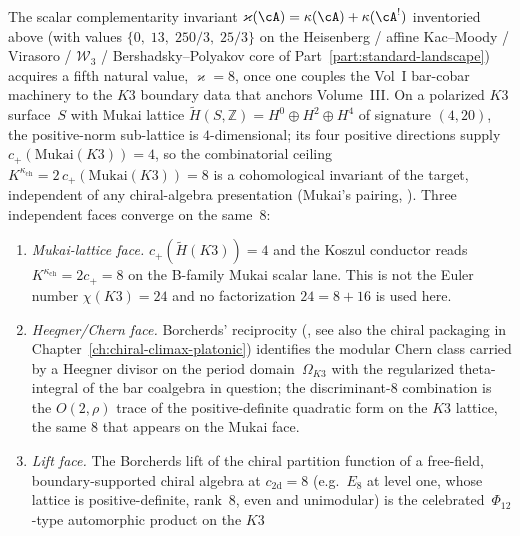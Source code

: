\begin{remark}
\label{rem:frontier-K3-bucket-enlargement}
\ClaimStatusConjectured
{}
The scalar complementarity invariant
$\varkappa(\cA) = \kappa(\cA) + \kappa(\cA^!)$
inventoried above (with values $\{0,\;13,\;250/3,\;25/3\}$ on the
Heisenberg / affine Kac--Moody / Virasoro / $\mathcal{W}_3$ /
Bershadsky--Polyakov core of Part~\ref{part:standard-landscape}) acquires
a fifth natural value, $\varkappa = 8$, once one couples the Vol~I
bar-cobar machinery to the $K3$ boundary data that anchors Volume~III.
On a polarized $K3$ surface~$S$ with Mukai lattice
$\widetilde{H}(S,\mathbb Z)
= H^0 \oplus H^2 \oplus H^4$
of signature $(4,20)$, the positive-norm sub-lattice is
$4$-dimensional; its four positive directions supply
$c_+(\mathrm{Mukai}(K3)) = 4$, so the combinatorial ceiling
$K^{\kappa_{\mathrm{ch}}} = 2\,c_+(\mathrm{Mukai}(K3)) = 8$
is a cohomological invariant of the target, independent of any
chiral-algebra presentation
\textup{(}Mukai's pairing,
\cite[Lemma~10.6]{Mukai81}\textup{)}. Three independent faces
converge on the same~$8$:
\begin{enumerate}[label=\textup{(\roman*)}]
\item \emph{Mukai-lattice face.}
 $c_+(\widetilde{H}(K3)) = 4$ and the Koszul conductor reads
 $K^{\kappa_{\mathrm{ch}}} = 2 c_+ = 8$ on the B-family Mukai
 scalar lane. This is not the Euler number
 $\chi(K3)=24$ and no factorization $24=8+16$ is used here.
\item \emph{Heegner/Chern face.}
 Borcherds' reciprocity
 \textup{(\cite{Borcherds1995}, see also the chiral packaging in
 Chapter~\ref{ch:chiral-climax-platonic})} identifies the
 modular Chern class carried by a Heegner divisor on the period
 domain~$\Omega_{K3}$ with the regularized theta-integral of the
 bar coalgebra in question; the discriminant-$8$ combination is
 the $O(2,\rho)$ trace of the positive-definite quadratic form on the
 $K3$ lattice, the same $8$ that appears on the Mukai face.
\item \emph{Lift face.}
 The Borcherds lift of the chiral partition function of a
 free-field, boundary-supported chiral algebra at
 $c_{2\mathrm d} = 8$ (e.g.~$E_8$ at level one, whose lattice is
 positive-definite, rank~$8$, even and unimodular) is the
 celebrated~$\Phi_{12}$-type automorphic product on the $K3$

\end{enumerate}
\end{remark}
